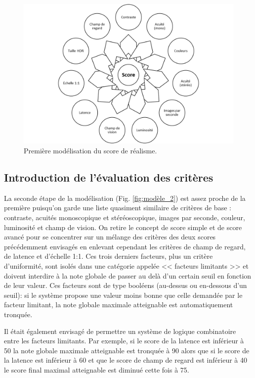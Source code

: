 	\begin{figure}[h]
		\centering
		\includegraphics[scale=.8]{Figures/Modele1_2}
		\caption{Première modélisation du score de réalisme.}
		\label{fig:modèle_1}
	\end{figure}
	
	\subsection{Introduction de l'évaluation des critères}
	\par La seconde étape de la modélisation  (Fig. \ref{fig:modèle_2}) est assez proche de la première puisqu'on garde une liste quasiment similaire de critères de base : contraste, acuités monoscopique et stéréoscopique, images par seconde, couleur, luminosité et champ de vision. On retire le concept de score simple et de score avancé pour se concentrer sur un mélange des critères des deux scores précédemment envisagés en enlevant cependant les critères de champ de regard, de latence et d'échelle 1:1. Ces trois derniers facteurs, plus un critère d'uniformité, sont isolés dans une catégorie appelée << facteurs limitants >> et doivent interdire à la note globale de passer au delà d'un certain seuil en fonction de leur valeur. Ces facteurs sont de type booléens (au-dessus ou en-dessous d'un seuil): si le système propose une valeur moins bonne que celle demandée par le facteur limitant, la note globale maximale atteignable est automatiquement tronquée.
	
	\par Il était également envisagé de permettre un système de logique combinatoire entre les facteurs limitants. Par exemple, si le score de la latence est inférieur à 50 la note globale maximale atteignable est tronquée à 90 alors que si le score de la latence est inférieur à 60 et que le score de champ de regard est inférieur à 40 le score final maximal atteignable est diminué cette fois à 75.
	

